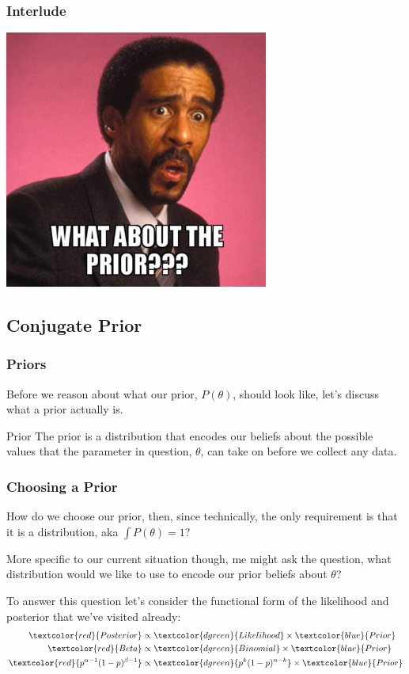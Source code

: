 \documentclass{beamer}
\begin{document}
\begin{frame}
  \frametitle{Interlude}
  \begin{center}
    \includegraphics[width=0.65\textwidth]{images/rp.png}
  \end{center}
\end{frame}

\subsection{Conjugate Prior}
\begin{frame}
  \frametitle{Priors}
  Before we reason about what our prior, $ P(\theta) $, should look like, let's discuss what a prior actually is. \vspace{2mm}

  \begin{block}{Prior}
    The prior is a distribution that encodes our beliefs about the possible values that the parameter in question, $ \theta $, can take on before we collect any data.
  \end{block}
\end{frame}

\begin{frame}
  \frametitle{Choosing a Prior}
  How do we choose our prior, then, since technically, the only requirement is that it is a distribution, aka $ \int P(\theta) = 1 $? \vspace{2mm}
  \pause

  More specific to our current situation though, me might ask the question, what distribution would we like to use to encode our prior beliefs about $ \theta $? \vspace{2mm}
  \pause

  To answer this question let's consider the functional form of the likelihood and posterior that we've visited already:
  \begin{align*}
    \textcolor{red}{Posterior} &\propto \textcolor{dgreen}{Likelihood} \times \textcolor{blue}{Prior} \\
    \textcolor{red}{Beta} &\propto \textcolor{dgreen}{Binomial} \times \textcolor{blue}{Prior} \\
    \textcolor{red}{p^{\alpha-1}(1-p)^{\beta-1}} &\propto \textcolor{dgreen}{p^{k}(1-p)^{n-k}} \times \textcolor{blue}{Prior}
  \end{align*}
\end{frame}
\end{document}
